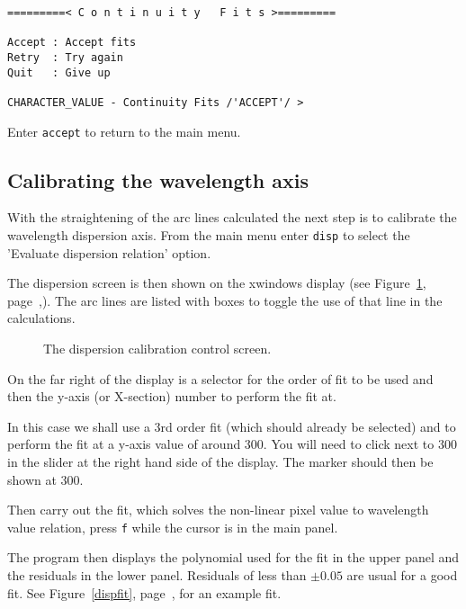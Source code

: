 \documentclass[twoside,11pt]{article}
\newcommand{\scspec}[2]{#1}
\newcommand{\scspec}[2]{#2}
\begin{document}
{\scspec{\small}{ }
\begin{verbatim}
=========< C o n t i n u i t y   F i t s >=========

Accept : Accept fits
Retry  : Try again
Quit   : Give up

CHARACTER_VALUE - Continuity Fits /'ACCEPT'/ >
\end{verbatim}
}

Enter {\tt accept} to return to the main menu.

\subsection{Calibrating the wavelength axis}


With the straightening of the arc lines calculated the next step is to
calibrate the wavelength dispersion axis. From the main menu enter
{\tt disp} to select the 'Evaluate dispersion relation' option.

The dispersion screen is then shown on the xwindows display (see
\scspec{Figure~\ref{dispdisplay}, page~\pageref{dispdisplay},}{the
figure below}). The arc lines are listed with boxes to toggle the use
of that line in the calculations.

\begin{figure}
\begin{center}
  \scspec{\leavevmode\epsfysize=105mm\epsfbox{sc7_17.eps}}
          {\leavevmode\epsfysize=136mm}

  \parbox{140mm}{
    \caption{The dispersion calibration control screen.}
    \label{dispdisplay}
  }
\end{center}
\end{figure}


On the far right of the display is a selector for the order of fit to be used
and then the y-axis (or X-section) number to perform the fit at.

In this case we shall use a 3rd order fit (which should already be
selected) and to perform the fit at a y-axis value of around 300. You
will need to click next to 300 in the slider at the right hand side of
the display. The marker should then be shown at 300.

Then carry out the fit, which solves the non-linear pixel value to
wavelength value relation, press {\tt f} while the cursor is in the
main panel.

The program then displays the polynomial used for the fit in the upper
panel and the residuals in the lower panel. Residuals of less than
$\pm0.05$ are usual for a good fit. See \scspec{Figure~\ref{dispfit},
page~\pageref{dispfit},}{the figure below} for an example fit.
\end{document}
